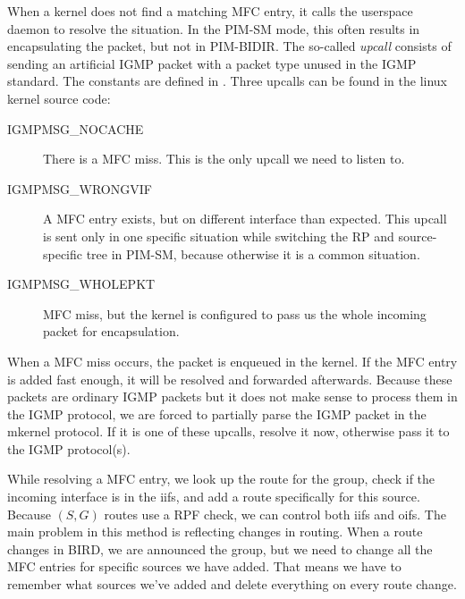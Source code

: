 When a kernel does not find a matching MFC entry, it calls the userspace daemon
to resolve the situation. In the PIM-SM mode, this often results in
encapsulating the packet, but not in PIM-BIDIR. The so-called \emph{upcall}
consists of sending an artificial IGMP packet with a packet type unused in the
IGMP standard. The constants are defined in . Three
upcalls can be found in the linux kernel source code:

\begin{description}
\item[IGMPMSG\_NOCACHE] There is a MFC miss. This is the only upcall we need to
  listen to.
\item[IGMPMSG\_WRONGVIF] A MFC entry exists, but on different interface than
  expected. This upcall is sent only in one specific situation while switching
  the RP and source-specific tree in PIM-SM, because otherwise it is a common
  situation.
\item[IGMPMSG\_WHOLEPKT] MFC miss, but the kernel is configured to pass us the
  whole incoming packet for encapsulation.
\end{description}

When a MFC miss occurs, the packet is enqueued in the kernel. If the MFC entry
is added fast enough, it will be resolved and forwarded afterwards. Because
these packets are ordinary IGMP packets but it does not make sense to process
them in the IGMP protocol, we are forced to partially parse the IGMP packet in
the mkernel protocol. If it is one of these upcalls, resolve it now, otherwise
pass it to the IGMP protocol(s).

While resolving a MFC entry, we look up the route for the group, check if the
incoming interface is in the iifs, and add a route specifically for this
source. Because $(S,G)$ routes use a RPF check, we can control both iifs and
oifs. The main problem in this method is reflecting changes in routing. When
a route changes in BIRD, we are announced the group, but we need to change all
the MFC entries for specific sources we have added. That means we have to
remember what sources we've added and delete everything on every route change.
